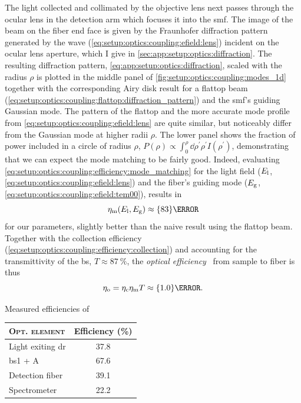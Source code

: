 The light collected and collimated by the objective lens next passes through the ocular lens in the detection arm which focuses it into the \gls{smf}.
The image of the beam on the fiber end face is given by the Fraunhofer diffraction pattern generated by the wave (\cref{eq:setup:optics:coupling:efield:lens}) incident on the ocular lens aperture, which I give in \cref{sec:app:setup:optics:diffraction}.
The resulting diffraction pattern, \cref{eq:app:setup:optics:diffraction}, scaled with the radius $\rho$ is plotted in the middle panel of \cref{fig:setup:optics:coupling:modes_1d} together with the corresponding Airy disk result for a flattop beam (\cref{eq:setup:optics:coupling:flattop:diffraction_pattern}) and the \gls{smf}'s guiding Gaussian mode.
The pattern of the flattop and the more accurate mode profile from \cref{eq:setup:optics:coupling:efield:lens} are quite similar, but noticeably differ from the Gaussian mode at higher radii $\rho$.
The lower panel shows the fraction of power included in a circle of radius $\rho$, $P(\rho)\propto \int_0^{\rho}\dd{\rho^{\prime}} \rho^{\prime} I(\rho^{\prime})$, demonstrating that we can expect the mode matching to be fairly good.
Indeed, evaluating \cref{eq:setup:optics:coupling:efficiency:mode_matching} for the light field ($E_{\mathrm{l}}$, \cref{eq:setup:optics:coupling:efield:lens}) and the fiber's guiding mode ($E_{\mathrm{g}}$, \cref{eq:setup:optics:coupling:efield:tem00}), results in
\begin{equation}\label{eq:setup:optics:coupling:efficiency:mode_matching:eval}
    \eta_{\mr{m}}(E_{\mr{l}}, E_{\mr{g}})\approx\qty{83}{\percent}
\end{equation}
for our parameters, slightly better than the naive result using the flattop beam.
Together with the collection efficiency (\cref{eq:setup:optics:coupling:efficiency:collection}) and accounting for the transmittivity of the \gls{bs}, $T\approx\qty{87}{\percent}$,
the \emph{optical efficiency}~\cite{Sze2007} from sample to fiber is thus
\begin{equation}\label{eq:setup:optics:coupling:efficiency:optical}
    \eta_{\mr{o}} = \eta_{\mr{c}}\eta_{\mr{m}} T \approx\qty{1.0}{\percent}.
\end{equation}

\begin{margintable}
    \centering
    \caption{Measured efficiencies of }
    \label{tab:setup:optics:efficiency:measured}
    \begin{tabular}{lS}
        \toprule
        \textsc{Opt. element}       & Efficiency (\unit{\percent}) \\
        \midrule
        Light exiting \acrshort{dr} & 37.8 \\
        \acrshort{bs}1 + A          & 67.6 \\
        Detection fiber             & 39.1 \\
        Spectrometer                & 22.2
        \bottomrule
    \end{tabular}
\end{margintable}


